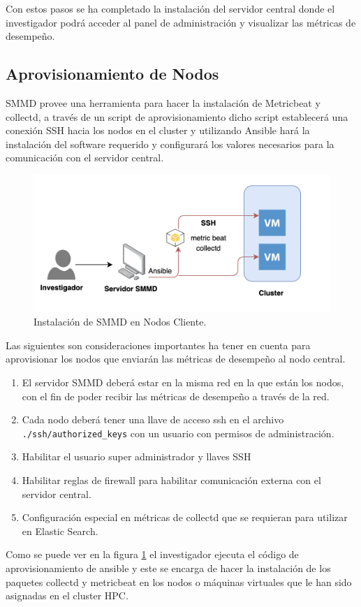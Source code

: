 Con estos pasos se ha completado la instalación del servidor central donde el investigador podrá acceder al panel de administración y visualizar las métricas de desempeño.

\newpage
\subsection{Aprovisionamiento de Nodos}
SMMD provee una herramienta para hacer la instalación de Metricbeat y collectd, a través de un script de aprovisionamiento dicho script establecerá una conexión SSH hacia los nodos en el cluster y utilizando Ansible hará la instalación del software requerido y configurará los valores necesarios para la comunicación con el servidor central.

\begin{figure}[ht]
 \centering
  \includegraphics[width=0.5\linewidth]{./imagenes/modelo-instalacion.png}
  \caption{Instalación de SMMD en Nodos Cliente.}
  \label{fig:modelo-instalacion}
\end{figure}

Las siguientes son consideraciones importantes ha tener en cuenta para aprovisionar los nodos que enviarán las métricas de desempeño al nodo central.
\begin{enumerate}
	\item El servidor SMMD deberá estar en la misma red en la que están los nodos, con el fin de poder recibir las métricas de desempeño a través de la red.
	\item Cada nodo deberá tener una llave de acceso \gls{ssh} en el archivo \texttt{./ssh/authorized\_keys} con un usuario con permisos de administración.
	\item Habilitar el usuario super administrador y llaves SSH
	\item Habilitar reglas de firewall para habilitar comunicación externa con el servidor central.
	\item Configuración especial en métricas de collectd que se requieran para utilizar en Elastic Search.
\end{enumerate}

Como se puede ver en la figura \ref{fig:modelo-instalacion} el investigador ejecuta el código de aprovisionamiento de \gls{ansible} y este se encarga de hacer la instalación de los paquetes collectd y metricbeat en los nodos o máquinas virtuales que le han sido asignadas en el cluster HPC.


